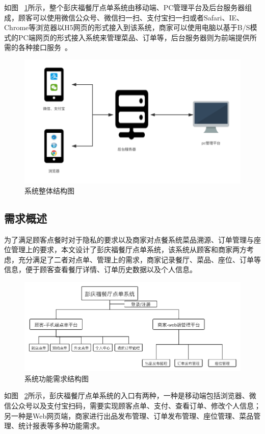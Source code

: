 如图
~\ref{fig_strucCH3}所示，整个彭庆福餐厅点单系统由移动端、PC管理平台及后台服务器组成，顾客可以使用微信公众号、微信扫一扫、支付宝扫一扫或者Safari、IE、Chrome等浏览器以H5网页的形式接入到该系统，商家可以使用电脑以基于B/S模式的PC端网页的形式接入系统来管理菜品、订单等，后台服务器则为前端提供所需的各种接口服务~\cite{gzy}。
\begin{figure}[htbp!]
    \centering
    \includegraphics[width=5in]{FIGs/chapter3/struc.pdf}
    \caption{系统整体结构图}\label{fig_strucCH3}
\end{figure}

\subsection{需求概述}
为了满足顾客点餐时对于隐私的要求以及商家对点餐系统菜品溯源、订单管理与座位管理上的要求，本文设计了彭庆福餐厅点单系统，该系统从顾客和商家两方考虑，充分满足了二者对点单、管理上的需求，商家记录餐厅、菜品、座位、订单等信息，便于顾客查看餐厅详情、订单历史数据以及个人信息。
\begin{figure}[htbp!]
    \centering
    \includegraphics[width=5in]{FIGs/chapter3/function.pdf}
    \caption{系统功能需求结构图}\label{fig_functionCH3}
\end{figure}

如图
~\ref{fig_functionCH3}所示，彭庆福餐厅点单系统的入口有两种，一种是移动端包括浏览器、微信公众号以及支付宝扫码，需要实现顾客点单、支付、查看订单、修改个人信息；另一种是Web网页端，商家进行出品发布管理、订单发布管理、座位管理、菜品管理、统计报表等多种功能需求。

